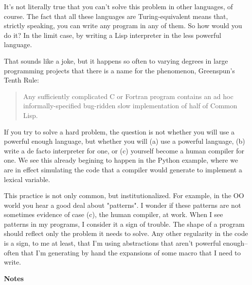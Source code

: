 It's not literally true that you can't solve
                  this problem in other languages, of course. The fact that all
                  these languages are Turing-equivalent means that, strictly
                  speaking, you can write any program in any of them. So how
                  would you do it? In the limit case, by writing a Lisp
                  interpreter in the less powerful language.

That
                  sounds like a joke, but it happens so often to varying degrees
                  in large programming projects that there is a name for the
                  phenomenon, Greenspun's Tenth Rule:
                  \begin{quote}

                    Any sufficiently complicated C or Fortran program contains
                    an ad hoc informally-specified bug-ridden slow
                    implementation of half of Common Lisp.
                  
\end{quote}

                  If you try to solve a hard problem, the question is not
                  whether you will use a powerful enough language, but whether
                  you will (a) use a powerful language, (b) write a de facto
                  interpreter for one, or (c) yourself become a human compiler
                  for one. We see this already begining to happen in the Python
                  example, where we are in effect simulating the code that a
                  compiler would generate to implement a lexical variable.

This
                  practice is not only common, but institutionalized. For
                  example, in the OO world you hear a good deal about
                  "patterns". I wonder if these patterns are not sometimes
                  evidence of case (c), the human compiler, at work. When I see
                  patterns in my programs, I consider it a sign of trouble. The
                  shape of a program should reflect only the problem it needs to
                  solve. Any other regularity in the code is a sign, to me at
                  least, that I'm using abstractions that aren't powerful
                  enough-- often that I'm generating by hand the expansions of
                  some macro that I need to write.



\textbf{Notes}


